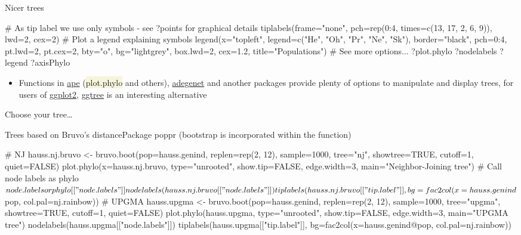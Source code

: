 \documentclass[compress, ucs, xelatex, 11pt, xcolor=svgnames, aspectratio=169,
	hyperref={
		bookmarks=true,
		unicode=true,
		colorlinks=true,
		pdftitle={Molecular data in R},
		plainpages=false,
		pdfauthor={Vojtech Zeisek},
		pdfsubject={Course about phylogeny and evolution in R},
		pdfcreator={XeLaTeX},
		pdfkeywords={R, evolution, phylogeny, molecular data},
		linkcolor=Crimson, %
		anchorcolor=Magenta, %
		citecolor=Magenta, %
		filecolor=Magenta, %
		menucolor=Magenta, %
		urlcolor=DodgerBlue, %
		pdftex},
	url={hyphens, lowtilde} %
	]{beamer}
\renewcommand{\texttt}[1]{\colorbox{Beige}{{\ttfamily #1}}}
\begin{document}
\begin{frame}[fragile]{Nicer trees}
	\begin{spluscode}
    # As tip label we use only symbols - see ?points for graphical details
    tiplabels(frame="none", pch=rep(0:4, times=c(13, 17, 2, 6, 9)), lwd=2,
      cex=2)
    # Plot a legend explaining symbols
    legend(x="topleft", legend=c("He", "Oh", "Pr", "Ne", "Sk"),
      border="black", pch=0:4, pt.lwd=2, pt.cex=2, bty="o", bg="lightgrey",
      box.lwd=2, cex=1.2, title="Populations")
    # See more options...
    ?plot.phylo
    ?nodelabels
    ?legend
    ?axisPhylo
	\end{spluscode}
	\begin{itemize}
		\item Functions in \href{https://CRAN.R-project.org/package=ape}{ape} (\texttt{plot.phylo} and others), \href{https://CRAN.R-project.org/package=adegenet}{adegenet} and another packages provide plenty of options to manipulate and display trees, for users of \href{https://CRAN.R-project.org/package=ggplot2}{ggplot2}, \href{https://bioconductor.org/packages/release/bioc/html/ggtree.html}{ggtree} is an interesting alternative
	\end{itemize}
\end{frame}

\begin{frame}{Choose your tree\ldots}
	\begin{center}
		\texttt{[image: nj2.png]}
	\end{center}
\end{frame}

\begin{frame}[fragile]{Trees based on Bruvo's distance}{Package poppr (bootstrap is incorporated within the function)}
	\begin{spluscode}
    # NJ
    hauss.nj.bruvo <- bruvo.boot(pop=hauss.genind, replen=rep(2, 12),
      sample=1000, tree="nj", showtree=TRUE, cutoff=1, quiet=FALSE)
    plot.phylo(x=hauss.nj.bruvo, type="unrooted", show.tip=FALSE,
      edge.width=3, main="Neighbor-Joining tree")
    # Call node labels as phylo$node.labels or phylo[["node.labels"]]
    nodelabels(hauss.nj.bruvo[["node.labels"]]) tiplabels(hauss.nj.bruvo
      [["tip.label"]], bg=fac2col(x=hauss.genind$pop, col.pal=nj.rainbow))
    # UPGMA
    hauss.upgma <- bruvo.boot(pop=hauss.genind, replen=rep(2, 12),
      sample=1000, tree="upgma", showtree=TRUE, cutoff=1, quiet=FALSE)
    plot.phylo(hauss.upgma, type="unrooted", show.tip=FALSE, edge.width=3,
      main="UPGMA tree")
    nodelabels(hauss.upgma[["node.labels"]])
    tiplabels(hauss.upgma[["tip.label"]], bg=fac2col(x=hauss.genind@pop,
      col.pal=nj.rainbow))
	\end{spluscode}
\end{frame}
\end{document}
